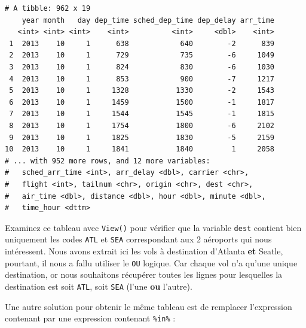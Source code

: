 \documentclass[a4paperpaper,]{article}
\newenvironment{Shaded}{\begin{snugshade}}{\end{snugshade}}
\newcommand{\DecValTok}[1]{\textcolor[rgb]{0.69,0.50,0.00}{#1}}
\newcommand{\KeywordTok}[1]{\textcolor[rgb]{0.12,0.11,0.11}{\textbf{#1}}}
\newcommand{\NormalTok}[1]{\textcolor[rgb]{0.12,0.11,0.11}{#1}}
\newcommand{\OperatorTok}[1]{\textcolor[rgb]{0.12,0.11,0.11}{#1}}
\newcommand{\StringTok}[1]{\textcolor[rgb]{0.75,0.01,0.01}{#1}}
\begin{document}
\begin{verbatim}
# A tibble: 962 x 19
    year month   day dep_time sched_dep_time dep_delay arr_time
   <int> <int> <int>    <int>          <int>     <dbl>    <int>
 1  2013    10     1      638            640        -2      839
 2  2013    10     1      729            735        -6     1049
 3  2013    10     1      824            830        -6     1030
 4  2013    10     1      853            900        -7     1217
 5  2013    10     1     1328           1330        -2     1543
 6  2013    10     1     1459           1500        -1     1817
 7  2013    10     1     1544           1545        -1     1815
 8  2013    10     1     1754           1800        -6     2102
 9  2013    10     1     1825           1830        -5     2159
10  2013    10     1     1841           1840         1     2058
# ... with 952 more rows, and 12 more variables:
#   sched_arr_time <int>, arr_delay <dbl>, carrier <chr>,
#   flight <int>, tailnum <chr>, origin <chr>, dest <chr>,
#   air_time <dbl>, distance <dbl>, hour <dbl>, minute <dbl>,
#   time_hour <dttm>
\end{verbatim}

Examinez ce tableau avec \texttt{View()} pour vérifier que la variable \texttt{dest} contient bien uniquement les codes \texttt{ATL} et \texttt{SEA} correspondant aux 2 aéroports qui nous intéressent. Nous avons extrait ici les vols à destination d'Atlanta \textbf{et} Seatle, pourtant, il nous a fallu utiliser le \texttt{OU} logique. Car chaque vol n'a qu'une unique destination, or nous souhaitons récupérer toutes les lignes pour lesquelles la destination est soit \texttt{ATL}, soit \texttt{SEA} (l'une \textbf{ou} l'autre).

Une autre solution pour obtenir le même tableau est de remplacer l'expression contenant \texttt{\textbar{}} par une expression contenant \texttt{\%in\%} :

\begin{Shaded}
\end{Shaded}
\end{document}
